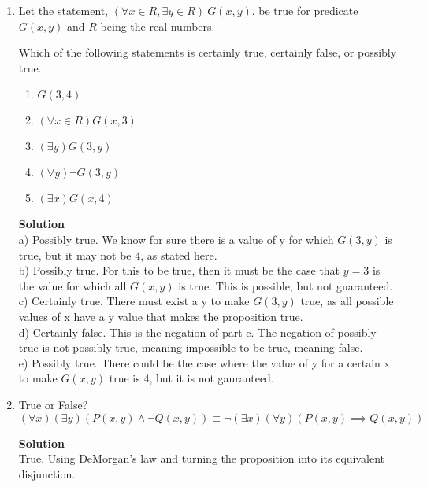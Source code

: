 \documentclass[11pt]{article}
\begin{document}
\begin{enumerate}
\item
Let the statement, $(\forall x \in R, \exists y \in R) \  G(x,y)$, be
true for predicate $G(x,y)$ and $R$ being the real numbers. 

Which of the following statements is certainly true, certainly false, or possibly true. 

\begin{enumerate}

\item
$G(3,4)$

\item
$(\forall x \in R) G(x,3)$

\item
$(\exists y) G(3,y)$

\item
$(\forall y) \neg G(3,y)$

\item
$(\exists x) G(x,4)$

\end{enumerate}

\begin{mdframed} \textbf{Solution} \\
a) Possibly true. We know for sure there is a value of y for which $G(3,y)$ is true, but it may not be 4, as stated here. \\
b) Possibly true. For this to be true, then it must be the case that $y=3$ is the value for which all $G(x,y)$ is true. This is possible, but not guaranteed. \\
c) Certainly true. There must exist a y to make $G(3,y)$ true, as all possible values of x have a y value that makes the proposition true. \\
d) Certainly false. This is the negation of part c. The negation of possibly true is not possibly true, meaning impossible to be true, meaning false. \\
e) Possibly true. There could be the case where the value of y for a certain x to make $G(x,y)$ true is 4, but it is not gauranteed. 
\end{mdframed}


\item True or False? \\
$(\forall x) (\exists y) (P(x,y) \land \neg Q(x,y)) \equiv \neg (\exists x) (\forall y) (P(x,y) \implies Q(x,y))$

\begin{mdframed} \textbf{Solution} \\
True. Using DeMorgan's law and turning the proposition into its equivalent disjunction.
\end{mdframed}


\end{enumerate}
\end{document}
